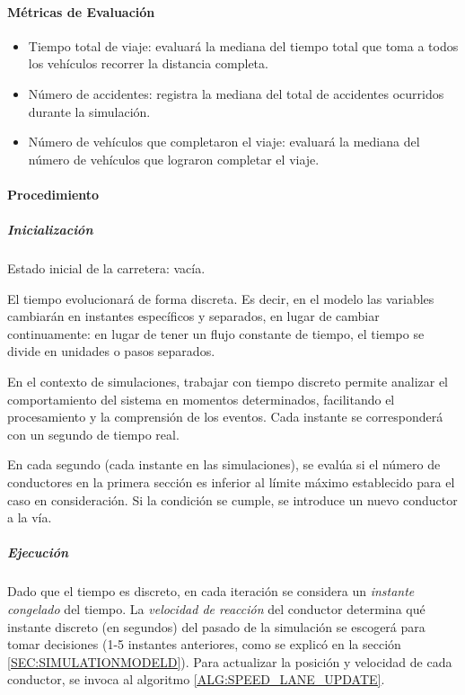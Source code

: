 \paragraph{Métricas de Evaluación}
\begin{itemize}
    \item Tiempo total de viaje: evaluará la mediana del tiempo total que toma a todos los vehículos recorrer la distancia completa.
    \item Número de accidentes: registra la mediana del total de accidentes ocurridos durante la simulación.
    \item Número de vehículos que completaron el viaje: evaluará la mediana del número de vehículos que lograron completar el viaje.
\end{itemize}

\paragraph{Procedimiento}

\subparagraph{Inicialización}

Estado inicial de la carretera: vacía.

El tiempo evolucionará de forma discreta. Es decir, en el modelo las variables cambiarán en instantes específicos y separados,
en lugar de cambiar continuamente: en lugar de tener un flujo constante de tiempo, el tiempo se divide en unidades o pasos separados.

En el contexto de simulaciones, trabajar con tiempo discreto permite analizar el comportamiento del sistema en momentos determinados,
facilitando el procesamiento y la comprensión de los eventos. Cada instante se corresponderá con un segundo de tiempo real.

En cada segundo (cada instante en las simulaciones), se evalúa si el número de conductores en la primera sección es inferior al límite máximo establecido para el caso en consideración.
Si la condición se cumple, se introduce un nuevo conductor a la vía.

\subparagraph{Ejecución}

Dado que el tiempo es discreto, en cada iteración se considera un \textit{instante congelado} del tiempo.
La \textit{velocidad de reacción} del conductor determina qué instante discreto (en segundos) del pasado de la simulación se escogerá
para tomar decisiones (1-5 instantes anteriores, como se explicó en la sección \ref{SEC:SIMULATIONMODELD}).
Para actualizar la posición y velocidad de cada conductor, se invoca al algoritmo \ref{ALG:SPEED_LANE_UPDATE}.

